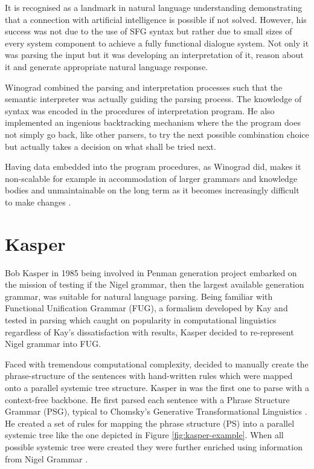 It is recognised as a landmark in natural language understanding demonstrating that a connection with artificial intelligence is possible if not solved. However, his success was not due to the use of SFG syntax but rather due to small sizes of every system component to achieve a fully functional dialogue system. Not only it was parsing the input but it was developing an interpretation of it, reason about it and generate appropriate natural language response. 

Winograd combined the parsing and interpretation processes such that the semantic interpreter was actually guiding the parsing process. The knowledge of syntax was encoded in the procedures of interpretation program. He also implemented an ingenious backtracking mechanism where the the program does not simply go back, like other parsers, to try the next possible combination choice but actually takes a decision on what shall be tried next.  

Having data embedded into the program procedures, as Winograd did, makes it non-scalable for example in accommodation of larger grammars and knowledge bodies and unmaintainable on the long term as it becomes increasingly difficult to make changes \citep{Weerasinghe1994}.

\section{Kasper}
Bob Kasper in 1985 being involved in Penman generation project embarked on the mission of testing if the Nigel grammar, then the largest available generation grammar, was suitable for natural language parsing. Being familiar with Functional Unification Grammar (FUG), a formalism developed by Kay and tested in parsing \citep{Kay1985} which caught on popularity in computational linguistics regardless of Kay's dissatisfaction with results, Kasper decided to re-represent Nigel grammar into FUG. 

Faced with tremendous computational complexity, \citet{Kasper1988} decided to manually create the phrase-structure of the sentences with hand-written rules which were mapped onto a parallel systemic tree structure. Kasper in \citeyear{Kasper1988} was the first one to parse with a context-free backbone. He first parsed each sentence with a Phrase Structure Grammar (PSG), typical to Chomsky's Generative Transformational Linguistics \citet{Chomsky1957}. He created a set of rules for mapping the phrase structure (PS) into a parallel systemic tree like the one depicted in Figure \ref{fig:kasper-example}. When all possible systemic tree were created they were further enriched using information from Nigel Grammar \citep{Matthiessen1985}.

